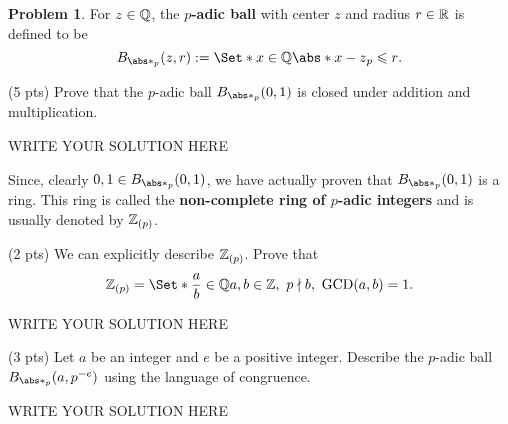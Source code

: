 \documentclass[11pt]{article}
\theoremstyle{plain}
\theoremstyle{definition}
\newtheorem{problem}{Problem}
\theoremstyle{remark}
\numberwithin{equation}{problem}
\providecommand\given{}
\DeclareMathOperator*\GCD{GCD}
\begin{document}
\begin{problem}
	For $z\in\mathbb{Q}$, the \textbf{$p$-adic ball} with center $z$ and radius $r\in\mathbb{R}$ is defined to be
	\[
		B_{\abs*{}_p}(z,r):=\Set*{ x\in\Q \given \abs*{x-z}_p\le r }.
	\]
	\begin{listinprob}[resume]
		\item (5 pts) Prove that the $p$-adic ball $B_{\abs*{}_p}(0,1)$ is closed under addition and multiplication.
	\end{listinprob}
\begin{solution} %
WRITE YOUR SOLUTION HERE
\end{solution}\clearpage %

	Since, clearly $0,1 \in B_{\abs*{}_p}(0,1)$, we have actually proven that $B_{\abs*{}_p}(0,1)$ is a ring. This ring is called the \textbf{non-complete ring of $p$-adic integers} and is usually denoted by $\mathbb{Z}_{(p)}$.
	\begin{listinprob}[resume]
		\item (2 pts) We can explicitly describe $\mathbb{Z}_{(p)}$. Prove that 
		\[
			\Z_{(p)} = 
			\Set*{
				\frac{a}{b}\in \Q \given a,b \in \Z,\ p\nmid b,\ \GCD(a,b)=1
			}.
		\]
\begin{solution} %
WRITE YOUR SOLUTION HERE
\end{solution}\clearpage %

		\item\label{p1.p-adic_to_congruence} (3 pts) Let $a$ be an integer and $e$ be a positive integer. Describe the $p$-adic ball $B_{\abs*{}_p}(a,p^{-e})$
		using the language of congruence.
	\end{listinprob}
\end{problem}
\begin{solution} %
WRITE YOUR SOLUTION HERE
\end{solution}\clearpage %
\end{document}
